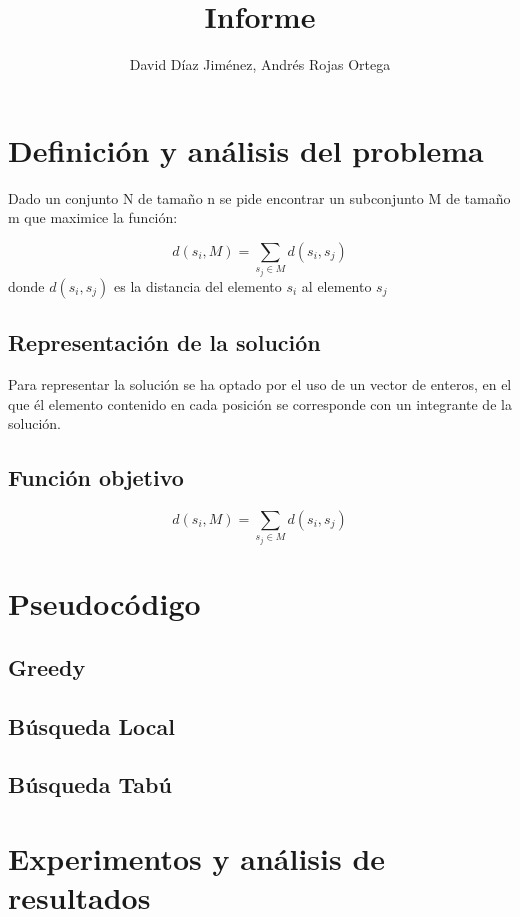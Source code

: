 \documentclass{article}
\title{Informe}
\author{David Díaz Jiménez, Andrés Rojas Ortega}
\begin{document}
	
	\maketitle
	
	\section{Definición y análisis del problema}
	
	Dado un conjunto N de tamaño n se pide encontrar un subconjunto M de tamaño m que maximice
	la función: 
	
	\[ d(s_i,M)=\sum_{s_j \in M} d(s_i,s_j)\]
	donde  $d(s_i,s_j)$ es la distancia del elemento $s_i$ al elemento $s_j$
	
	\subsection{Representación de la solución}
	
	Para representar la solución se ha optado por el uso de un vector de enteros, en el que él elemento contenido en cada posición se corresponde con un integrante de la solución.
	
	\subsection{Función objetivo}
	
	\[ d(s_i,M)=\sum_{s_j \in M} d(s_i,s_j)\]
	
	\section{Pseudocódigo}
	
	\subsection{Greedy}
	
	\subsection{Búsqueda Local}
	
	\subsection{Búsqueda Tabú}
	
	
	\section{Experimentos y análisis de resultados}
	
\end{document}
